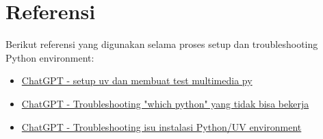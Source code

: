 \documentclass[11pt,a4paper]{article}
\begin{document}
\section{Referensi}

Berikut referensi yang digunakan selama proses setup dan troubleshooting Python environment:

\begin{itemize}
    \item \href{https://chatgpt.com/share/68b15fe0-1258-8001-a44f-8431584ab118}{ChatGPT - setup uv dan membuat test multimedia py}
    \item \href{https://chatgpt.com/share/68add498-692c-8001-aba7-ba2e1cd8390c}{ChatGPT - Troubleshooting "which python" yang tidak bisa bekerja}
    \item \href{https://chatgpt.com/share/68add574-3730-8001-990b-85420e938ead}{ChatGPT - Troubleshooting isu instalasi Python/UV environment}
\end{itemize}


\newpage


\end{document}

